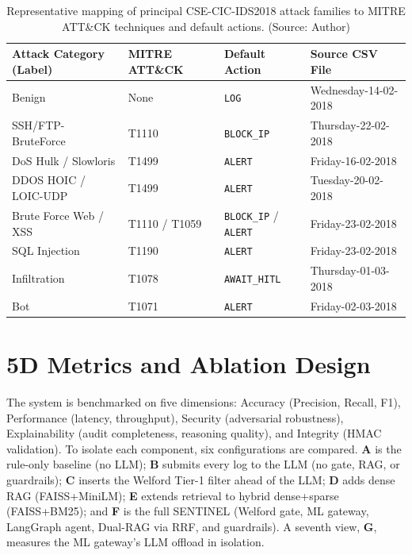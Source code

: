 \begin{table}[!htbp]
    \centering
    \caption{Representative mapping of principal CSE-CIC-IDS2018 attack families to MITRE ATT\&CK techniques and default actions. (Source: Author)}
    \label{tab:dataset_distribution}
    \begin{tabular}{|>{\raggedright\arraybackslash}p{}|>{\centering\arraybackslash}p{}|>{\centering\arraybackslash}p{}|>{\raggedright\arraybackslash}p{}|}
        \hline
        \textbf{Attack Category (Label)} & \textbf{MITRE ATT\&CK} & \textbf{Default Action} & \textbf{Source CSV File} \\
        \hline
        Benign & None & \texttt{LOG} & Wednesday-14-02-2018 \\ \hline
        SSH/FTP-BruteForce & T1110 & \texttt{BLOCK\_IP} & Thursday-22-02-2018 \\ \hline
        DoS Hulk / Slowloris & T1499 & \texttt{ALERT} & Friday-16-02-2018 \\ \hline
        DDOS HOIC / LOIC-UDP & T1499 & \texttt{ALERT} & Tuesday-20-02-2018 \\ \hline
        Brute Force Web / XSS & T1110 / T1059 & \texttt{BLOCK\_IP} / \texttt{ALERT} & Friday-23-02-2018 \\ \hline
        SQL Injection & T1190 & \texttt{ALERT} & Friday-23-02-2018 \\ \hline
        Infiltration & T1078 & \texttt{AWAIT\_HITL} & Thursday-01-03-2018 \\ \hline
        Bot & T1071 & \texttt{ALERT} & Friday-02-03-2018 \\ \hline
    \end{tabular}
\end{table}

\section{5D Metrics and Ablation Design}
The system is benchmarked on five dimensions: Accuracy (Precision, Recall, F1), Performance (latency, throughput), Security (adversarial robustness), Explainability (audit completeness, reasoning quality), and Integrity (HMAC validation). To isolate each component, six configurations are compared. \textbf{A} is the rule-only baseline (no LLM); \textbf{B} submits every log to the LLM (no gate, RAG, or guardrails); \textbf{C} inserts the Welford Tier-1 filter ahead of the LLM; \textbf{D} adds dense RAG (FAISS+MiniLM); \textbf{E} extends retrieval to hybrid dense+sparse (FAISS+BM25); and \textbf{F} is the full SENTINEL (Welford gate, ML gateway, LangGraph agent, Dual-RAG via RRF, and guardrails). A seventh view, \textbf{G}, measures the ML gateway's LLM offload in isolation.

